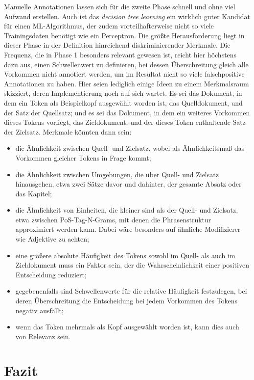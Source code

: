 \documentclass{article}
\newcommand*{\englisch}[1]{\foreignlanguage{english}{\textit{#1}}}%
\begin{document}
Manuelle Annotationen lassen sich für die zweite Phase schnell und
ohne viel Aufwand erstellen. Auch ist das \englisch{decision tree
  learning} ein wirklich guter Kandidat für einen ML-Algorithmus, der
zudem vorteilhafterweise nicht so viele Trainingsdaten benötigt wie
ein Perceptron. Die größte Herausforderung liegt in dieser Phase in
der Definition hinreichend diskriminierender Merkmale. Die Frequenz,
die in Phase 1 besonders relevant gewesen ist, reicht hier höchstens
dazu aus, einen Schwellenwert zu definieren, bei dessen Überschreitung
gleich alle Vorkommen nicht annotiert werden, um im Resultat nicht so
viele falschpositive Annotationen zu haben. Hier seien lediglich
einige Ideen zu einem Merkmalsraum skizziert, deren Implementierung
noch auf sich wartet. Es sei das Dokument, in dem ein Token als
Beispielkopf ausgewählt worden ist, das Quelldokument, und der Satz
der Quellsatz; und es sei das Dokument, in dem ein weiteres Vorkommen
dieses Tokens vorliegt, das Zieldokument, und der dieses Token
enthaltende Satz der Zielsatz. Merkmale könnten dann sein:
\begin{itemize}
\item die Ähnlichkeit zwischen Quell- und Zielsatz, wobei als
  Ähnlichkeitsmaß das Vorkommen gleicher Tokens in Frage kommt;
\item die Ähnlichkeit zwischen Umgebungen, die über Quell- und
  Zielsatz hinausgehen, etwa zwei Sätze davor und dahinter, der
  gesamte Absatz oder das Kapitel;
\item die Ähnlichkeit von Einheiten, die kleiner sind als der Quell-
  und Zielsatz, etwa zwischen PoS-Tag-N-Grams, mit denen die
  Phrasenstruktur approximiert werden kann. Dabei wäre besonders auf
  ähnliche Modifizierer wie Adjektive zu achten;
\item eine größere absolute Häufigkeit des Tokens sowohl im Quell- als
  auch im Zieldokument muss ein Faktor sein, der die
  Wahrscheinlichkeit einer positiven Entscheidung reduziert;
\item gegebenenfalls sind Schwellenwerte für die relative Häufigkeit
  festzulegen, bei deren Überschreitung die Entscheidung bei jedem
  Vorkommen des Tokens negativ ausfällt;
\item wenn das Token mehrmals als Kopf ausgewählt worden ist, kann
  dies auch von Relevanz sein.
\end{itemize}

\section*{Fazit}
\end{document}
